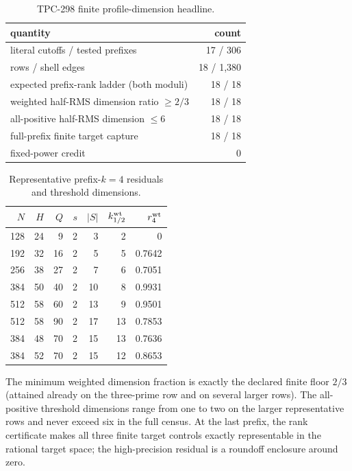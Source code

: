 \documentclass[10pt]{article}
\begin{document}
\begin{table}[ht]
\centering
\small
\caption{TPC-298 finite profile-dimension headline.}
\label{tab:headline}
\begin{tabular}{@{}lr@{}}
\toprule
quantity & count\\
\midrule
literal cutoffs / tested prefixes & 17 / 306\\
rows / shell edges & 18 / 1,380\\
expected prefix-rank ladder (both moduli) & 18 / 18\\
weighted half-RMS dimension ratio $\ge 2/3$ & 18 / 18\\
all-positive half-RMS dimension $\le 6$ & 18 / 18\\
full-prefix finite target capture & 18 / 18\\
fixed-power credit & 0\\
\bottomrule
\end{tabular}
\end{table}

\begin{table}[ht]
\centering
\scriptsize
\caption{Representative prefix-$k=4$ residuals and threshold dimensions.}
\label{tab:rows}
\begin{tabular}{@{}rrrrrrr@{}}
\toprule
$N$ & $H$ & $Q$ & $s$ & $|S|$ & $k_{1/2}^{\rm wt}$ & $r_4^{\rm wt}$\\
\midrule
128&24&9 &2&3 &2 & $0$\\
192&32&16&2&5 &5 &0.7642\\
256&38&27&2&7 &6 &0.7051\\
384&50&40&2&10&8 &0.9931\\
512&58&60&2&13&9 &0.9501\\
512&58&90&2&17&13&0.7853\\
384&48&70&2&15&13&0.7636\\
384&52&70&2&15&12&0.8653\\
\bottomrule
\end{tabular}
\end{table}

The minimum weighted dimension fraction is exactly the declared finite floor
$2/3$ (attained already on the three-prime row and on several larger rows).
The all-positive threshold dimensions range from one to two on the larger
representative rows and never exceed six in the full census.  At the last
prefix, the rank certificate makes all three finite target controls exactly
representable in the rational target space; the high-precision residual is a
roundoff enclosure around zero.
\end{document}

